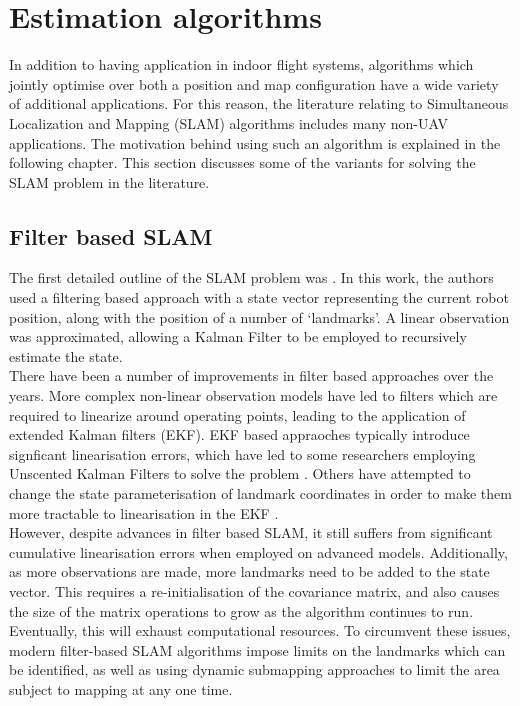 \documentclass[capstone_report.tex]{subfiles}
\begin{document}
\section{Estimation algorithms}
In addition to having application in indoor flight systems, algorithms which jointly optimise over both a position and map configuration have a wide variety of additional applications. For this reason, the literature relating to Simultaneous Localization and Mapping (SLAM) algorithms includes many non-UAV applications. The motivation behind using such an algorithm is explained in the following chapter. This section discusses some of the variants for solving the SLAM problem in the literature.\\

\subsection{Filter based SLAM}
The first detailed outline of the SLAM problem was \cite{smithcheese}. In this work, the authors used a filtering based approach with a state vector representing the current robot position, along with the position of a number of `landmarks'. A linear observation was approximated, allowing a Kalman Filter to be employed to recursively estimate the state.\\

There have been a number of improvements in filter based approaches over the years. More complex non-linear observation models have led to filters which are required to linearize around operating points, leading to the application of extended Kalman filters (EKF). EKF based appraoches typically introduce signficant linearisation errors, which have led to some researchers employing Unscented Kalman Filters to solve the problem \cite{julier}. Others have attempted to change the state parameterisation of landmark coordinates in order to make them more tractable to linearisation in the EKF \cite{julier}.\\

However, despite advances in filter based SLAM, it still suffers from significant cumulative linearisation errors when employed on advanced models. Additionally, as more observations are made, more landmarks need to be added to the state vector. This requires a re-initialisation of the covariance matrix, and also causes the size of the matrix operations to grow as the algorithm continues to run. Eventually, this will exhaust computational resources. To circumvent these issues, modern filter-based SLAM algorithms impose limits on the landmarks which can be identified, as well as using dynamic submapping approaches to limit the area subject to mapping at any one time.
\end{document}
